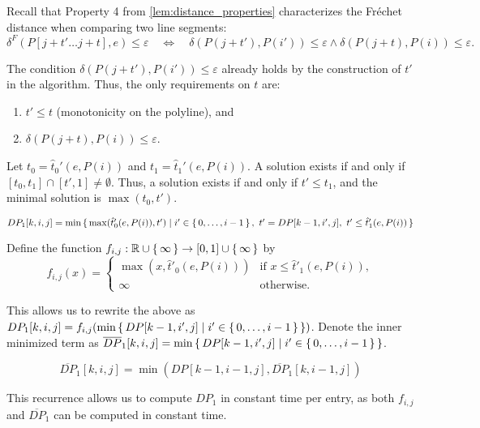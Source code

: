 Recall that Property 4 from \cref{lem:distance_properties} characterizes the Fréchet distance when comparing two line segments:
	\[\delta^F(P[j + t' \dots j + t], e) \leq \varepsilon \quad \iff \quad \delta(P(j+t'), P(i')) \leq \varepsilon \land \delta(P(j+t), P(i)) \leq \varepsilon.\]
	
The condition \(\delta(P(j+t'), P(i')) \leq \varepsilon\) already holds by the construction of \(t'\) in the algorithm. Thus, the only requirements on \(t\) are:
\begin{enumerate}
	\item \(t' \leq t\) (monotonicity on the polyline), and
	\item \(\delta(P(j + t), P(i)) \leq \varepsilon\).
\end{enumerate}

Let \(t_0 = \hat t_0'(e, P(i))\) and \(t_1 = \hat t_1'(e, P(i))\). A solution exists if and only if \([t_0, t_1] \cap [t', 1] \neq \emptyset\). Thus, a solution exists if and only if \(t' \leq t_1\), and the minimal solution is \(\max(t_0, t')\). 

\begin{observation}
	\(DP_1[k, i, j] = \min \set{ \max(\hat t'_0(e, P(i)), t') \mid i' \in \set{0, \dots, i - 1},\ t' = DP[k-1, i', j],\ t' \leq \hat t_1'(e, P(i)) }\)
\end{observation}

Define the function \(f_{i,j}: \mathbb{R} \cup \set{\infty} \to [0, 1] \cup \set{\infty}\) by
	\[f_{i,j}(x) =
	\begin{cases}
		\max(x, \hat t'_0(e, P(i))) &\textrm{if } x \leq \hat t'_1(e, P(i)), \\
		\infty &\textrm{otherwise}.
	\end{cases}\]

This allows us to rewrite the above as \(DP_1[k, i, j] = f_{i, j}(\min \set{DP[k-1, i', j] \mid i' \in \set{0, \dots, i - 1} })\). Denote the inner minimized term as \(\overline{DP}_1[k,i,j] = \min \set{DP[k-1, i', j] \mid i' \in \set{0, \dots, i - 1}}\).

\begin{observation}
	\[\overline{DP}_1[k,i,j] = \min (DP[k-1, i - 1, j], \overline{DP}_1[k, i - 1, j])\]
\end{observation}

This recurrence allows us to compute \(DP_1\) in constant time per entry, as both \(f_{i, j}\) and \(\overline{DP}_1\) can be computed in constant time.


